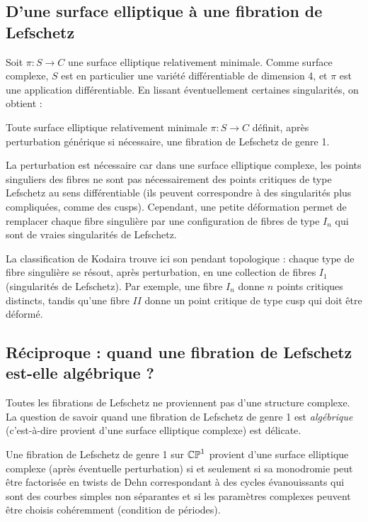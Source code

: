 \subsection{D'une surface elliptique à une fibration de Lefschetz}

Soit $\pi: S \to C$ une surface elliptique relativement minimale. Comme surface complexe, $S$ est en particulier une variété différentiable de dimension 4, et $\pi$ est une application différentiable. En lissant éventuellement certaines singularités, on obtient :

\begin{proposition}
Toute surface elliptique relativement minimale $\pi: S \to C$ définit, après perturbation générique si nécessaire, une fibration de Lefschetz de genre 1.
\end{proposition}

La perturbation est nécessaire car dans une surface elliptique complexe, les points singuliers des fibres ne sont pas nécessairement des points critiques de type Lefschetz au sens différentiable (ils peuvent correspondre à des singularités plus compliquées, comme des cusps). Cependant, une petite déformation permet de remplacer chaque fibre singulière par une configuration de fibres de type $I_n$ qui sont de vraies singularités de Lefschetz.

\begin{remarque}
La classification de Kodaira trouve ici son pendant topologique : chaque type de fibre singulière se résout, après perturbation, en une collection de fibres $I_1$ (singularités de Lefschetz). Par exemple, une fibre $I_n$ donne $n$ points critiques distincts, tandis qu'une fibre $II$ donne un point critique de type cusp qui doit être déformé.
\end{remarque}

\subsection{Réciproque : quand une fibration de Lefschetz est-elle algébrique ?}

Toutes les fibrations de Lefschetz ne proviennent pas d'une structure complexe. La question de savoir quand une fibration de Lefschetz de genre 1 est \emph{algébrique} (c'est-à-dire provient d'une surface elliptique complexe) est délicate.

\begin{theoreme}
Une fibration de Lefschetz de genre 1 sur $\mathbb{CP}^1$ provient d'une surface elliptique complexe (après éventuelle perturbation) si et seulement si sa monodromie peut être factorisée en twists de Dehn correspondant à des cycles évanouissants qui sont des courbes simples non séparantes et si les paramètres complexes peuvent être choisis cohéremment (condition de périodes).
\end{theoreme}

